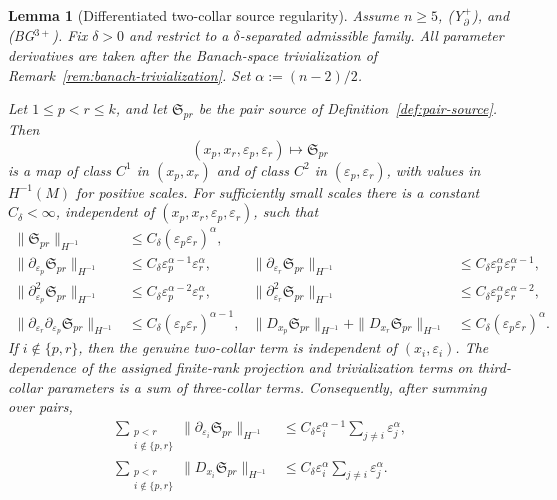 \documentclass[11pt,reqno,a4paper]{amsart}
\numberwithin{equation}{section}
\theoremstyle{plain}
\newtheorem{lemma}[theorem]{Lemma}
\theoremstyle{remark}
\theoremstyle{plain}
\begin{document}
\begin{lemma}[Differentiated two-collar source regularity]
\label{lem:two-collar-source-regularity}
Assume $n\ge5$, \textup{(Y$^+_{\partial}$)}, and \textup{(BG$^{3+}$)}.  Fix
$\delta>0$ and restrict to a $\delta$-separated admissible family.  All parameter
derivatives are taken after the Banach-space trivialization of
Remark~\ref{rem:banach-trivialization}.  Set $\alpha:=(n-2)/2$.

Let $1\le p<r\le k$, and let $\mathfrak S_{pr}$ be the pair source of
Definition~\ref{def:pair-source}.  Then
\[
(x_p,x_r,\varepsilon_p,\varepsilon_r)\longmapsto \mathfrak S_{pr}
\]
is a map of class $C^1$ in $(x_p,x_r)$ and of class $C^2$ in
$(\varepsilon_p,\varepsilon_r)$, with values in $H^{-1}(M)$ for positive scales.
For sufficiently small scales there is a constant $C_\delta<\infty$, independent of
$(x_p,x_r,\varepsilon_p,\varepsilon_r)$, such that
\begin{align}
\|\mathfrak S_{pr}\|_{H^{-1}}
&\le C_\delta(\varepsilon_p\varepsilon_r)^\alpha,
\label{eq:S-pr-lemma-value}\\
\|\partial_{\varepsilon_p}\mathfrak S_{pr}\|_{H^{-1}}
&\le C_\delta\varepsilon_p^{\alpha-1}\varepsilon_r^\alpha,
&
\|\partial_{\varepsilon_r}\mathfrak S_{pr}\|_{H^{-1}}
&\le C_\delta\varepsilon_p^\alpha\varepsilon_r^{\alpha-1},
\\
\|\partial_{\varepsilon_p}^2\mathfrak S_{pr}\|_{H^{-1}}
&\le C_\delta\varepsilon_p^{\alpha-2}\varepsilon_r^\alpha,
&
\|\partial_{\varepsilon_r}^2\mathfrak S_{pr}\|_{H^{-1}}
&\le C_\delta\varepsilon_p^\alpha\varepsilon_r^{\alpha-2},
\label{eq:S-pr-lemma-scale}\\
\|\partial_{\varepsilon_r}\partial_{\varepsilon_p}\mathfrak S_{pr}\|_{H^{-1}}
&\le C_\delta(\varepsilon_p\varepsilon_r)^{\alpha-1},
&
\|D_{x_p}\mathfrak S_{pr}\|_{H^{-1}}
+\|D_{x_r}\mathfrak S_{pr}\|_{H^{-1}}
&\le C_\delta(\varepsilon_p\varepsilon_r)^\alpha.
\label{eq:S-pr-lemma-mixed-center}
\end{align}
If $i\notin\{p,r\}$, then the genuine two-collar term is independent of
$(x_i,\varepsilon_i)$.  The dependence of the assigned finite-rank projection and
trivialization terms on third-collar parameters is a sum of three-collar terms.
Consequently, after summing over pairs,
\begin{align}
\sum_{\substack{p<r\\i\notin\{p,r\}}}
\|\partial_{\varepsilon_i}\mathfrak S_{pr}\|_{H^{-1}}
&\le C_\delta\varepsilon_i^{\alpha-1}\sum_{j\ne i}\varepsilon_j^\alpha,
\label{eq:S-pr-lemma-third-scale}\\
\sum_{\substack{p<r\\i\notin\{p,r\}}}
\|D_{x_i}\mathfrak S_{pr}\|_{H^{-1}}
&\le C_\delta\varepsilon_i^\alpha\sum_{j\ne i}\varepsilon_j^\alpha.
\label{eq:S-pr-lemma-third-center}
\end{align}
\end{lemma}
\end{document}
